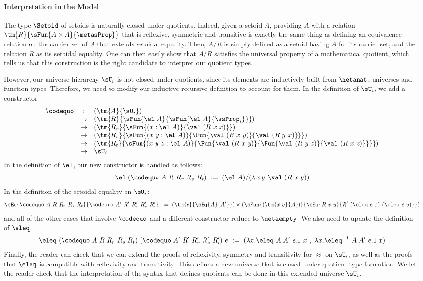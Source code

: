 \paragraph{Interpretation in the Model}

The type \( \Setoid \) of setoids is naturally closed under quotients. Indeed, given a setoid
\( A \), providing \( A \) with a relation \( \tm{R}{\sFun{A \times A}{\metasProp}} \) that is
reflexive, symmetric and transitive is exactly the same thing as defining an equivalence relation on
the carrier set of \( A \) that extends setoidal equality. Then, \( A/R \) is simply defined
as a setoid having \( A \) for its carrier set, and the relation \( R \) as its setoidal equality.
One can then easily show that \( A/R \) satisfies the universal property of a mathematical
quotient, which tells us that this construction is the right candidate to interpret our quotient
types.

However, our universe hierarchy \( \sU_i \) is not closed under quotients, since its elements are
inductively built from \( \metanat \), universes and function types. Therefore, we need to modify
our inductive-recursive definition to account for them. In the definition of \( \sU_i \), we add
a constructor
{\small
\[
\begin{array}{rcl}
  \codequo & : & (\tm{A}{\sU_i}) \\
    & \rightarrow & (\tm{R}{\sFun{\el\ A}{\sFun{\el\ A}{\ssProp_i}}}) \\
    & \rightarrow & (\tm{R_r}{\sFun{(x : \el\ A)}{\val\ (R\ x\ x)}}) \\
    & \rightarrow & (\tm{R_s}{\sFun{(x\ y : \el\ A)}{\Fun{\val\ (R\ x\ y)}{\val\ (R\ y\ x)}}}) \\
    & \rightarrow & (\tm{R_t}{\sFun{(x\ y\ z : \el\ A)}{\Fun{\val\ (R\ x\ y)}{\Fun{\val\ (R\ y\ z)}{\val\ (R\ x\ z)}}}}) \\
    & \rightarrow & \sU_i
\end{array}
\]
}
%
In the definition of \( \el \), our new constructor is handled as follows:
{\small
\[
  \el\ (\codequo\ A\ R\ R_r\ R_s\ R_t)
  \ := \
  (\el\ A)/(\lambda\, x\, y .\, \val\ (R\ x\ y))
\]
}
In the definition of the setoidal equality on \( \sU_i \):
{\small
\[
  \sEq{\codequo\ A\ R\ R_r\ R_s\ R_t}{\codequo\ A'\ R'\ R'_r\ R'_s\ R'_t}
  \ := \
  (\tm{e}{\sEq{A}{A'}}) \times (\sFun{(\tm{x\ y}{A})}{\sEq{R\ x\ y}{R'\ (\eleq\ e\ x)\ (\eleq\ e\ y)}})
\]
}
and all of the other cases that involve \( \codequo \) and a different constructor reduce to
\( \metaempty \). We also need to update the definition of \( \eleq \):
{\small
\[
  \eleq\ (\codequo\ A\ R\ R_r\ R_s\ R_t)\ (\codequo\ A'\ R'\ R'_r\ R'_s\ R'_t)\ e
  \ := \
  (\lambda x.\eleq\ A\ A'\ e.1\ x\ ,\ \lambda x.\eleq^{-1}\ A\ A'\ e.1\ x)
\]
}
Finally, the reader can check that we can extend the proofs of reflexivity, symmetry and
transitivity for \( \approx \) on \( \sU_i \), as well as the proofs that \( \eleq \)
is compatible with reflexivity and transitivity. This defines a new universe that is closed
under quotient type formation.
%
We let the reader check that the interpretation of the syntax that
defines quotients can be done in this extended universe \( \sU_i \).

